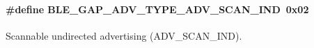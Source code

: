 \paragraph[{\texorpdfstring{B\+L\+E\+\_\+\+G\+A\+P\+\_\+\+A\+D\+V\+\_\+\+T\+Y\+P\+E\+\_\+\+A\+D\+V\+\_\+\+S\+C\+A\+N\+\_\+\+I\+ND}{BLE_GAP_ADV_TYPE_ADV_SCAN_IND}}]{\setlength{\rightskip}{0pt plus 5cm}\#define B\+L\+E\+\_\+\+G\+A\+P\+\_\+\+A\+D\+V\+\_\+\+T\+Y\+P\+E\+\_\+\+A\+D\+V\+\_\+\+S\+C\+A\+N\+\_\+\+I\+ND~0x02}\hypertarget{group___b_l_e___g_a_p___a_d_v___t_y_p_e_ga594ca8490efef1702e8ccb6a28d2a1de}{}\label{group___b_l_e___g_a_p___a_d_v___t_y_p_e_ga594ca8490efef1702e8ccb6a28d2a1de}
Scannable undirected advertising (A\+D\+V\+\_\+\+S\+C\+A\+N\+\_\+\+I\+ND). 